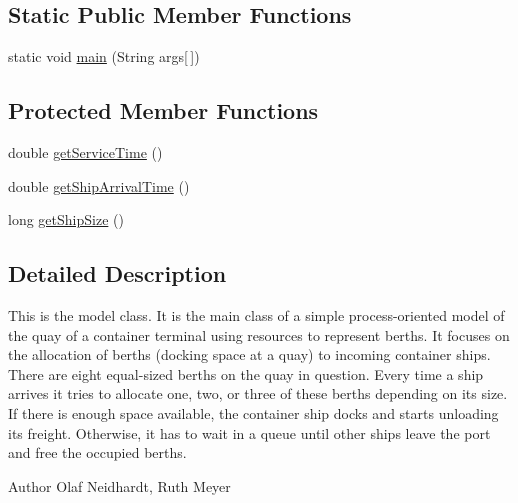 \subsection*{Static Public Member Functions}
\begin{DoxyCompactItemize}
\item 
static void \hyperlink{class_res_example_a24f19749855594fbb1dd5e6363dfbd26}{main} (String args\mbox{[}$\,$\mbox{]})
\end{DoxyCompactItemize}
\subsection*{Protected Member Functions}
\begin{DoxyCompactItemize}
\item 
double \hyperlink{class_res_example_a7fabf49b9a1e22badd86d3d910382792}{get\-Service\-Time} ()
\item 
double \hyperlink{class_res_example_aa3f32e8d8ddbc582e6a3b7c2f890d935}{get\-Ship\-Arrival\-Time} ()
\item 
long \hyperlink{class_res_example_a0dbd04a235f2ecb12d2cb1f424cfc589}{get\-Ship\-Size} ()
\end{DoxyCompactItemize}


\subsection{Detailed Description}
This is the model class. It is the main class of a simple process-\/oriented model of the quay of a container terminal using resources to represent berths. It focuses on the allocation of berths (docking space at a quay) to incoming container ships. There are eight equal-\/sized berths on the quay in question. Every time a ship arrives it tries to allocate one, two, or three of these berths depending on its size. If there is enough space available, the container ship docks and starts unloading its freight. Otherwise, it has to wait in a queue until other ships leave the port and free the occupied berths. \begin{DoxyAuthor}{Author}
Olaf Neidhardt, Ruth Meyer 
\end{DoxyAuthor}


